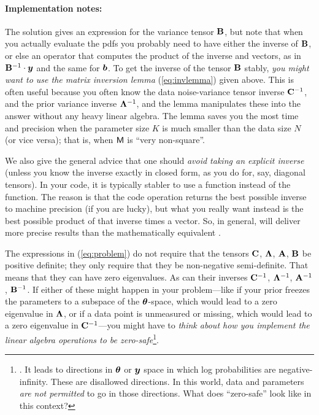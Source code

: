 \paragraph{Implementation notes:}
The solution gives an expression for the variance tensor $\mathbf{B}$, but
note that when you actually evaluate the pdfs you probably need to
have either the inverse of $\mathbf{B}$, or else an operator that computes
the product of the inverse and vectors, as in $\mathbf{B}^{-1}\cdot\boldsymbol{y}$ and
the same for $\boldsymbol{b}$.
To get the inverse of the tensor $\mathbf{B}$ stably, \emph{you might want to use
the matrix inversion lemma} (\ref{eq:invlemma}) given above.
This is often useful because you often know the data noise-variance
tensor inverse $\mathbf{C}^{-1}$, and the prior variance inverse
$\mathbf{\Lambda}^{-1}$, and the lemma manipulates these into the answer without
any heavy linear algebra.
The lemma saves you the most time and precision when the parameter size $K$
is much smaller than the data size $N$ (or vice versa); that is, when $\mathsf{M}$
is ``very non-square''.

We also give the general advice that one should \emph{avoid taking an explicit
inverse} (unless you know the inverse exactly in closed form, as you do
for, say, diagonal tensors).
In your code, it is typically stabler to use a  function instead
of the  function.
The reason is that the code operation  returns the best
possible inverse to machine precision (if you are lucky), but what you
really want instead is the best possible product of that inverse times
a vector.
So, in general,  will deliver more precise results than
the mathematically equivalent .

The expressions in (\ref{eq:problem}) do not require that the tensors
$\mathbf{C}$, $\mathbf{\Lambda}$, $\mathbf{A}$, $\mathbf{B}$ be positive definite; they only require
that they be non-negative semi-definite.
That means that they can have zero eigenvalues.
As can their inverses $\mathbf{C}^{-1}$, $\mathbf{\Lambda}^{-1}$, $\mathbf{A}^{-1}$, $\mathbf{B}^{-1}$.
If either of these might happen in your problem---like if your prior
freezes the parameters to a subspace of the $\boldsymbol{\theta}$-space, which
would lead to a zero eigenvalue in $\mathbf{\Lambda}$, or if a data point is
unmeasured or missing, which would lead to a zero eigenvalue in
$\mathbf{C}^{-1}$---you might have to \emph{think about how you implement the
  linear algebra operations to be zero-safe}\footnote{. It leads to directions in $\boldsymbol{\theta}$ or $\boldsymbol{y}$ space
  in which log probabilities are negative-infinity. These are
  disallowed directions. In this world, data and parameters \emph{are
    not permitted} to go in those directions. What does ``zero-safe''
  look like in this context?}.


